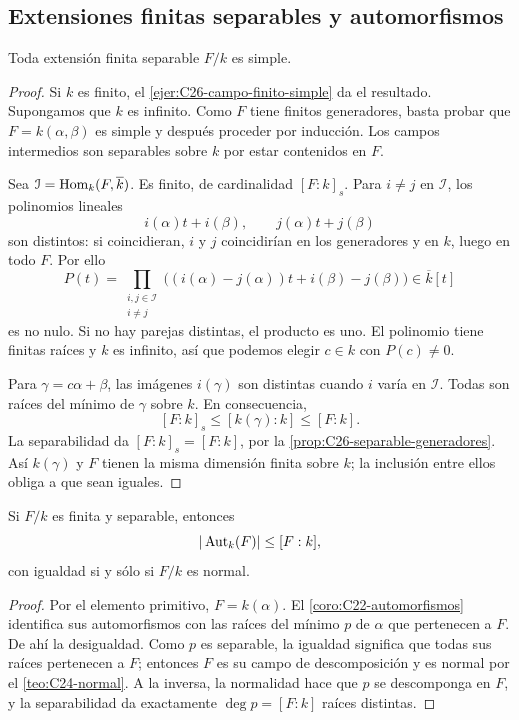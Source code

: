 \subsection{Extensiones finitas separables y automorfismos}\label{tema:26-2-2}
\begin{prop}\label{prop:C26-primitivo}
Toda extensión finita separable $F/k$ es simple.
\end{prop}
\begin{proof}
Si $k$ es finito, el \cref{ejer:C26-campo-finito-simple} da el resultado. Supongamos que $k$ es infinito. Como $F$ tiene finitos generadores, basta probar que $F=k(\alpha,\beta)$ es simple y después proceder por inducción. Los campos intermedios son separables sobre $k$ por estar contenidos en $F$.

Sea $\mathcal I=\operatorname{Hom}_k(F,\overline k)$. Es finito, de cardinalidad $[F:k]_s$. Para $i\ne j$ en $\mathcal I$, los polinomios lineales
\[
i(\alpha)t+i(\beta),\qquad j(\alpha)t+j(\beta)
\]
son distintos: si coincidieran, $i$ y $j$ coincidirían en los generadores y en $k$, luego en todo $F$. Por ello
\[
P(t)=\prod_{\substack{i,j\in\mathcal I\\i\ne j}}
\bigl((i(\alpha)-j(\alpha))t+i(\beta)-j(\beta)\bigr)
\in\overline k[t]
\]
es no nulo. Si no hay parejas distintas, el producto es uno. El polinomio tiene finitas raíces y $k$ es infinito, así que podemos elegir $c\in k$ con $P(c)\ne0$.

Para $\gamma=c\alpha+\beta$, las imágenes $i(\gamma)$ son distintas cuando $i$ varía en $\mathcal I$. Todas son raíces del mínimo de $\gamma$ sobre $k$. En consecuencia,
\[
[F:k]_s\leq[k(\gamma):k]\leq[F:k].
\]
La separabilidad da $[F:k]_s=[F:k]$, por la \cref{prop:C26-separable-generadores}. Así $k(\gamma)$ y $F$ tienen la misma dimensión finita sobre $k$; la inclusión entre ellos obliga a que sean iguales.
\end{proof}

\begin{coro}\label{coro:C26-aut-normal}
Si $F/k$ es finita y separable, entonces
\[
|\operatorname{Aut}_k(F)|\leq[F:k],
\]
con igualdad si y sólo si $F/k$ es normal.
\end{coro}
\begin{proof}
Por el elemento primitivo, $F=k(\alpha)$. El \cref{coro:C22-automorfismos} identifica sus automorfismos con las raíces del mínimo $p$ de $\alpha$ que pertenecen a $F$. De ahí la desigualdad. Como $p$ es separable, la igualdad significa que todas sus raíces pertenecen a $F$; entonces $F$ es su campo de descomposición y es normal por el \cref{teo:C24-normal}. A la inversa, la normalidad hace que $p$ se descomponga en $F$, y la separabilidad da exactamente $\deg p=[F:k]$ raíces distintas.
\end{proof}
